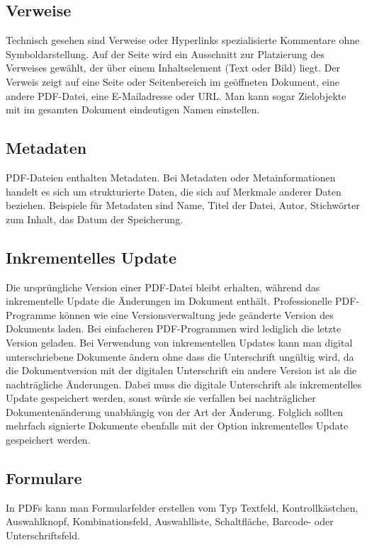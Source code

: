 \subsection{Verweise}
Technisch gesehen sind Verweise oder Hyperlinks spezialisierte Kommentare ohne Symboldarstellung. Auf der Seite wird ein Ausschnitt zur Platzierung des Verweises gewählt, der über einem Inhaltselement (Text oder Bild) liegt. Der Verweis zeigt auf eine Seite oder Seitenbereich im geöffneten Dokument, eine andere PDF-Datei, eine E-Mailadresse oder URL. Man kann sogar Zielobjekte mit im gesamten Dokument eindeutigen Namen einstellen. \cite{softx}

\subsection{Metadaten}
PDF-Dateien enthalten Metadaten. Bei Metadaten oder Metainformationen handelt es sich um strukturierte Daten, die sich auf Merkmale anderer Daten beziehen. Beispiele für Metadaten sind Name, Titel der Datei, Autor, Stichwörter zum Inhalt, das Datum der Speicherung.

\subsection{Inkrementelles Update}
Die ursprüngliche Version einer PDF-Datei bleibt erhalten, während das inkrementelle Update die Änderungen im Dokument enthält. Professionelle PDF-Programme können wie eine Versionsverwaltung jede geänderte Version des Dokuments laden. Bei einfacheren PDF-Programmen wird lediglich die letzte Version geladen. Bei Verwendung von inkrementellen Updates kann man digital unterschriebene Dokumente ändern ohne dass die Unterschrift ungültig wird, da die Dokumentversion mit der digitalen Unterschrift ein andere Version ist als die nachträgliche Änderungen. Dabei muss die digitale Unterschrift als inkrementelles Update gespeichert werden, sonst würde sie verfallen bei nachträglicher Dokumentenänderung unabhängig von der Art der Änderung. Folglich sollten mehrfach signierte Dokumente ebenfalls mit der Option inkrementelles Update gespeichert werden. \cite{softx}

\subsection{Formulare}
In PDFs kann man Formularfelder erstellen vom Typ Textfeld, Kontrollkästchen, Auswahlknopf, Kombinationsfeld, Auswahlliste, Schaltfläche, Barcode- oder
Unterschriftsfeld. \cite{softx}
